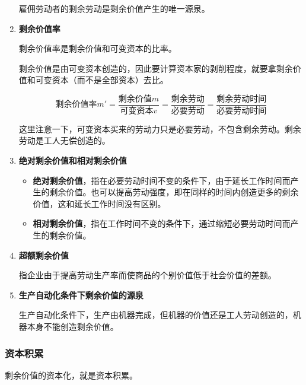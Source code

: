 \documentclass[12pt, a4paper, oneside]{ctexart}
\begin{document}
\begin{enumerate}
  雇佣劳动者的剩余劳动是剩余价值产生的唯一源泉。

  \item {\bf 剩余价值率}
  
  剩余价值率是剩余价值和可变资本的比率。

  剩余价值是由可变资本创造的，因此要计算资本家的剥削程度，就要拿剩余价值和可变资本（而不是全部资本）去比。

  \begin{equation*}
    \text{剩余价值率}m'=\frac{\text{剩余价值}m}{\text{可变资本}v}=\frac{\text{剩余劳动}}{\text{必要劳动}}=\frac{\text{剩余劳动时间}}{\text{必要劳动时间}}
  \end{equation*}

  这里注意一下，可变资本买来的劳动力只是必要劳动，不包含剩余劳动。剩余劳动是工人无偿创造的。

  \item {\bf 绝对剩余价值和相对剩余价值}
  
  \begin{itemize}
    \item {\bf 绝对剩余价值}，指在必要劳动时间不变的条件下，由于延长工作时间而产生的剩余价值。也可以提高劳动强度，即在同样的时间内创造更多的剩余价值，这和延长工作时间没有区别。
    \item {\bf 相对剩余价值}，指在工作时间不变的条件下，通过缩短必要劳动时间而产生的剩余价值。
  \end{itemize}

  \item {\bf 超额剩余价值}
  
  指企业由于提高劳动生产率而使商品的个别价值低于社会价值的差额。

  \item {\bf 生产自动化条件下剩余价值的源泉}
  
  生产自动化条件下，生产由机器完成，但机器的价值还是工人劳动创造的，机器本身不能创造剩余价值。

\end{enumerate}

\subsubsection{资本积累}

剩余价值的资本化，就是资本积累。
\end{document}
